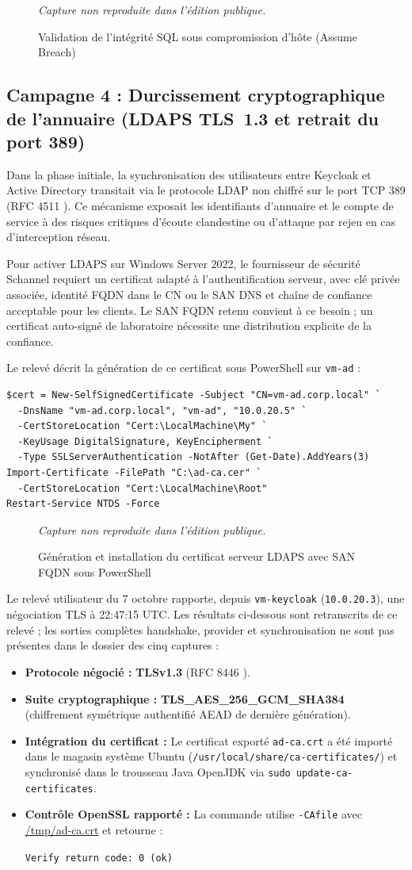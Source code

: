 \documentclass[a4paper,12pt]{report}
\newcommand{\publiccapture}[1]{%
  \begin{figure}[H]\centering
  {\footnotesize\itshape Capture non reproduite dans l'édition publique.}
  \caption{#1}\end{figure}}
\begin{document}
\publiccapture{Validation de l'intégrité SQL sous compromission d'hôte (Assume Breach)}

\subsection{Campagne 4 : Durcissement cryptographique de l'annuaire (LDAPS TLS~1.3 et retrait du port 389)}
Dans la phase initiale, la synchronisation des utilisateurs entre Keycloak et Active Directory transitait via le protocole LDAP non chiffré sur le port TCP 389 (RFC 4511 \cite{rfc4511}). Ce mécanisme exposait les identifiants d'annuaire et le compte de service à des risques critiques d'écoute clandestine ou d'attaque par rejeu en cas d'interception réseau.

Pour activer LDAPS sur Windows Server 2022, le fournisseur de sécurité Schannel requiert un certificat adapté à l'authentification serveur, avec clé privée associée, identité FQDN dans le CN ou le SAN DNS et chaîne de confiance acceptable pour les clients. Le SAN FQDN retenu convient à ce besoin ; un certificat auto-signé de laboratoire nécessite une distribution explicite de la confiance.

Le relevé décrit la génération de ce certificat sous PowerShell sur \texttt{vm-ad} :
\begin{verbatim}
$cert = New-SelfSignedCertificate -Subject "CN=vm-ad.corp.local" `
  -DnsName "vm-ad.corp.local", "vm-ad", "10.0.20.5" `
  -CertStoreLocation "Cert:\LocalMachine\My" `
  -KeyUsage DigitalSignature, KeyEncipherment `
  -Type SSLServerAuthentication -NotAfter (Get-Date).AddYears(3)
Import-Certificate -FilePath "C:\ad-ca.cer" `
  -CertStoreLocation "Cert:\LocalMachine\Root"
Restart-Service NTDS -Force
\end{verbatim}

\publiccapture{Génération et installation du certificat serveur LDAPS avec SAN FQDN sous PowerShell}

Le relevé utilisateur du 7 octobre rapporte, depuis \texttt{vm-keycloak} (\texttt{10.0.20.3}), une négociation TLS à 22:47:15 UTC. Les résultats ci-dessous sont retranscrits de ce relevé ; les sorties complètes handshake, provider et synchronisation ne sont pas présentes dans le dossier des cinq captures :
\begin{itemize}
\item \textbf{Protocole négocié :} \textbf{TLSv1.3} (RFC 8446 \cite{rfc8446}).
\item \textbf{Suite cryptographique :} \textbf{TLS\_AES\_256\_GCM\_SHA384} (chiffrement symétrique authentifié AEAD de dernière génération).
\item \textbf{Intégration du certificat :} Le certificat exporté \texttt{ad-ca.crt} a été importé dans le magasin système Ubuntu (\texttt{/usr/local/share/ca-certificates/}) et synchronisé dans le trousseau Java OpenJDK via \texttt{sudo update-ca-certificates}.
\item \textbf{Contrôle OpenSSL rapporté :} La commande utilise \texttt{-CAfile} avec \url{/tmp/ad-ca.crt} et retourne :
\begin{center}\small\texttt{Verify return code: 0 (ok)}\end{center}
\end{itemize}
\end{document}
